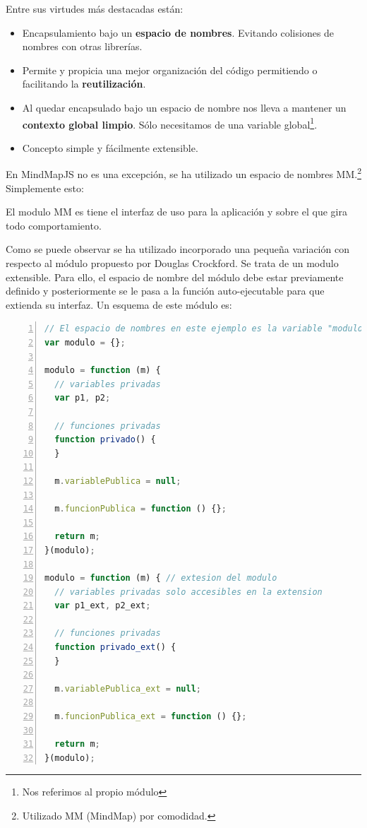 Entre sus virtudes más destacadas están:
\begin{itemize}
\item Encapsulamiento bajo un \textbf{espacio de nombres}. Evitando colisiones de nombres con otras librerías.
\item Permite y propicia una mejor organización del código permitiendo o facilitando la \textbf{reutilización}.
\item Al quedar encapsulado bajo un espacio de nombre nos lleva a mantener un \textbf{contexto global limpio}. Sólo necesitamos de una variable global\footnote{Nos referimos al propio módulo}.
\item Concepto simple y fácilmente extensible.
\end{itemize}

En MindMapJS no es una excepción, se ha utilizado un espacio de nombres MM.\footnote{Utilizado MM (MindMap) por comodidad.} Simplemente esto:
\lstset{inputencoding=utf8/latin1}


El modulo MM es tiene el interfaz de uso para la aplicación y sobre el que gira todo comportamiento. 




Como se puede observar se ha utilizado incorporado una pequeña variación con respecto al módulo propuesto por Douglas Crockford. Se trata de un modulo extensible. Para ello, el espacio de nombre del módulo debe estar previamente definido y posteriormente se le pasa a la función auto-ejecutable para que extienda su interfaz. Un esquema de este módulo es:

\begin{lstlisting}[language=JavaScript, numbers=left]
// El espacio de nombres en este ejemplo es la variable "modulo"
var modulo = {};

modulo = function (m) {
  // variables privadas
  var p1, p2;
 
  // funciones privadas
  function privado() {
  }
 
  m.variablePublica = null;
  
  m.funcionPublica = function () {};
 
  return m;
}(modulo);

modulo = function (m) { // extesion del modulo
  // variables privadas solo accesibles en la extension
  var p1_ext, p2_ext;
 
  // funciones privadas
  function privado_ext() {
  }
 
  m.variablePublica_ext = null;
  
  m.funcionPublica_ext = function () {};
 
  return m;
}(modulo);
\end{lstlisting}


